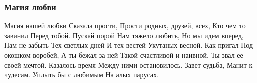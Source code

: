  
 
 

\subsubsection{Магия любви}

Магия нашей любви
Сказала прости,
Прости родных, друзей, всех,
Кто чем то завинил
Перед тобой.
Пускай порой
Нам тяжело любить,
Но мы идем вперед,
Нам не забыть
Тех светлых дней
И тех вестей
Укутаных весной.
Как пригал
Под окошком воробей,
А ты бежал за ней
Такой счастливой и наивной.
Ты звал ее своей мечтой.
Казалось время
Между ними остановилось.
Завет судьба,
Манит к чудесам.
Уплыть бы с любимым
На алых парусах.
